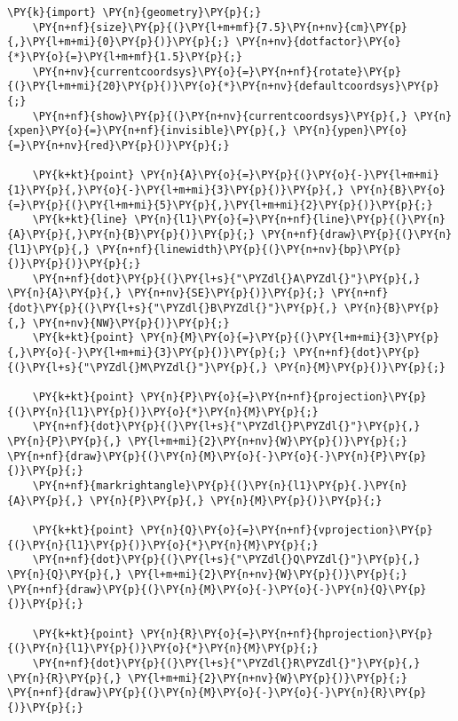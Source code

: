\begin{Verbatim}[commandchars=\\\{\}]
    \PY{k}{import} \PY{n}{geometry}\PY{p}{;}
    \PY{n+nf}{size}\PY{p}{(}\PY{l+m+mf}{7.5}\PY{n+nv}{cm}\PY{p}{,}\PY{l+m+mi}{0}\PY{p}{)}\PY{p}{;} \PY{n+nv}{dotfactor}\PY{o}{*}\PY{o}{=}\PY{l+m+mf}{1.5}\PY{p}{;}
    \PY{n+nv}{currentcoordsys}\PY{o}{=}\PY{n+nf}{rotate}\PY{p}{(}\PY{l+m+mi}{20}\PY{p}{)}\PY{o}{*}\PY{n+nv}{defaultcoordsys}\PY{p}{;}
    \PY{n+nf}{show}\PY{p}{(}\PY{n+nv}{currentcoordsys}\PY{p}{,} \PY{n}{xpen}\PY{o}{=}\PY{n+nf}{invisible}\PY{p}{,} \PY{n}{ypen}\PY{o}{=}\PY{n+nv}{red}\PY{p}{)}\PY{p}{;}

    \PY{k+kt}{point} \PY{n}{A}\PY{o}{=}\PY{p}{(}\PY{o}{-}\PY{l+m+mi}{1}\PY{p}{,}\PY{o}{-}\PY{l+m+mi}{3}\PY{p}{)}\PY{p}{,} \PY{n}{B}\PY{o}{=}\PY{p}{(}\PY{l+m+mi}{5}\PY{p}{,}\PY{l+m+mi}{2}\PY{p}{)}\PY{p}{;}
    \PY{k+kt}{line} \PY{n}{l1}\PY{o}{=}\PY{n+nf}{line}\PY{p}{(}\PY{n}{A}\PY{p}{,}\PY{n}{B}\PY{p}{)}\PY{p}{;} \PY{n+nf}{draw}\PY{p}{(}\PY{n}{l1}\PY{p}{,} \PY{n+nf}{linewidth}\PY{p}{(}\PY{n+nv}{bp}\PY{p}{)}\PY{p}{)}\PY{p}{;}
    \PY{n+nf}{dot}\PY{p}{(}\PY{l+s}{"\PYZdl{}A\PYZdl{}"}\PY{p}{,} \PY{n}{A}\PY{p}{,} \PY{n+nv}{SE}\PY{p}{)}\PY{p}{;} \PY{n+nf}{dot}\PY{p}{(}\PY{l+s}{"\PYZdl{}B\PYZdl{}"}\PY{p}{,} \PY{n}{B}\PY{p}{,} \PY{n+nv}{NW}\PY{p}{)}\PY{p}{;}
    \PY{k+kt}{point} \PY{n}{M}\PY{o}{=}\PY{p}{(}\PY{l+m+mi}{3}\PY{p}{,}\PY{o}{-}\PY{l+m+mi}{3}\PY{p}{)}\PY{p}{;} \PY{n+nf}{dot}\PY{p}{(}\PY{l+s}{"\PYZdl{}M\PYZdl{}"}\PY{p}{,} \PY{n}{M}\PY{p}{)}\PY{p}{;}

    \PY{k+kt}{point} \PY{n}{P}\PY{o}{=}\PY{n+nf}{projection}\PY{p}{(}\PY{n}{l1}\PY{p}{)}\PY{o}{*}\PY{n}{M}\PY{p}{;}
    \PY{n+nf}{dot}\PY{p}{(}\PY{l+s}{"\PYZdl{}P\PYZdl{}"}\PY{p}{,} \PY{n}{P}\PY{p}{,} \PY{l+m+mi}{2}\PY{n+nv}{W}\PY{p}{)}\PY{p}{;} \PY{n+nf}{draw}\PY{p}{(}\PY{n}{M}\PY{o}{-}\PY{o}{-}\PY{n}{P}\PY{p}{)}\PY{p}{;}
    \PY{n+nf}{markrightangle}\PY{p}{(}\PY{n}{l1}\PY{p}{.}\PY{n}{A}\PY{p}{,} \PY{n}{P}\PY{p}{,} \PY{n}{M}\PY{p}{)}\PY{p}{;}

    \PY{k+kt}{point} \PY{n}{Q}\PY{o}{=}\PY{n+nf}{vprojection}\PY{p}{(}\PY{n}{l1}\PY{p}{)}\PY{o}{*}\PY{n}{M}\PY{p}{;}
    \PY{n+nf}{dot}\PY{p}{(}\PY{l+s}{"\PYZdl{}Q\PYZdl{}"}\PY{p}{,} \PY{n}{Q}\PY{p}{,} \PY{l+m+mi}{2}\PY{n+nv}{W}\PY{p}{)}\PY{p}{;} \PY{n+nf}{draw}\PY{p}{(}\PY{n}{M}\PY{o}{-}\PY{o}{-}\PY{n}{Q}\PY{p}{)}\PY{p}{;}

    \PY{k+kt}{point} \PY{n}{R}\PY{o}{=}\PY{n+nf}{hprojection}\PY{p}{(}\PY{n}{l1}\PY{p}{)}\PY{o}{*}\PY{n}{M}\PY{p}{;}
    \PY{n+nf}{dot}\PY{p}{(}\PY{l+s}{"\PYZdl{}R\PYZdl{}"}\PY{p}{,} \PY{n}{R}\PY{p}{,} \PY{l+m+mi}{2}\PY{n+nv}{W}\PY{p}{)}\PY{p}{;} \PY{n+nf}{draw}\PY{p}{(}\PY{n}{M}\PY{o}{-}\PY{o}{-}\PY{n}{R}\PY{p}{)}\PY{p}{;}


\end{Verbatim}
